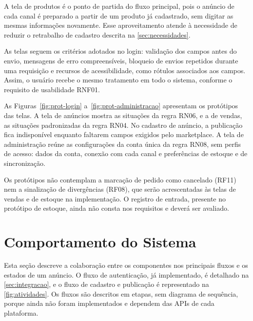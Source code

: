 A tela de produtos é o ponto de partida do fluxo principal, pois o anúncio de cada canal é preparado a partir de um produto já cadastrado, sem digitar as mesmas informações novamente. Esse aproveitamento atende à necessidade de reduzir o retrabalho de cadastro descrita na \autoref{sec:necessidades}.

As telas seguem os critérios adotados no login: validação dos campos antes do envio, mensagens de erro compreensíveis, bloqueio de envios repetidos durante uma requisição e recursos de acessibilidade, como rótulos associados aos campos. Assim, o usuário recebe o mesmo tratamento em todo o sistema, conforme o requisito de usabilidade RNF01.

As Figuras~\ref{fig:prot-login} a~\ref{fig:prot-administracao} apresentam os protótipos das telas. A tela de anúncios mostra as situações da regra RN06, e a de vendas, as situações padronizadas da regra RN04. No cadastro de anúncio, a publicação fica indisponível enquanto faltarem campos exigidos pelo marketplace. A tela de administração reúne as configurações da conta única da regra RN08, sem perfis de acesso: dados da conta, conexão com cada canal e preferências de estoque e de sincronização.

Os protótipos não contemplam a marcação de pedido como cancelado (RF11) nem a sinalização de divergências (RF08), que serão acrescentadas às telas de vendas e de estoque na implementação. O registro de entrada, presente no protótipo de estoque, ainda não consta nos requisitos e deverá ser avaliado.


\section{Comportamento do Sistema}

Esta seção descreve a colaboração entre os componentes nos principais fluxos e os estados de um anúncio. O fluxo de autenticação, já implementado, é detalhado na \autoref{sec:integracao}, e o fluxo de cadastro e publicação é representado na \autoref{fig:atividades}. Os fluxos são descritos em etapas, sem diagrama de sequência, porque ainda não foram implementados e dependem das APIs de cada plataforma.

